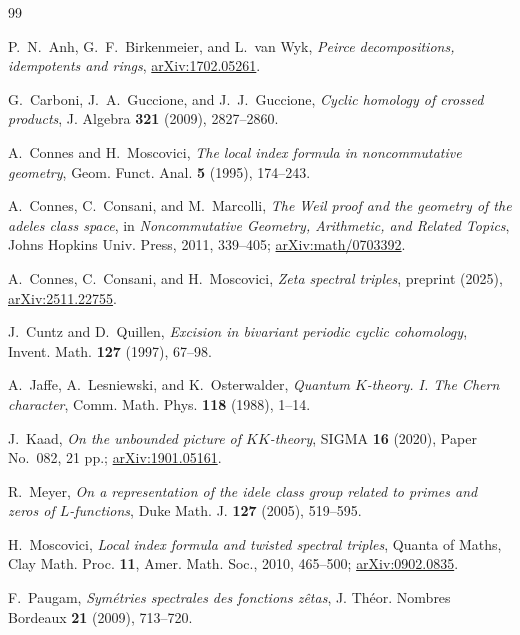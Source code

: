 \documentclass[11pt,reqno]{amsart}
\begin{document}
\begin{thebibliography}{99}

P.~N.~Anh, G.~F.~Birkenmeier, and L.~van Wyk,
\emph{Peirce decompositions, idempotents and rings},
\href{https://arxiv.org/abs/1702.05261}{arXiv:1702.05261}.

G.~Carboni, J.~A.~Guccione, and J.~J.~Guccione,
\emph{Cyclic homology of crossed products},
J. Algebra \textbf{321} (2009), 2827--2860.

A.~Connes and H.~Moscovici,
\emph{The local index formula in noncommutative geometry},
Geom. Funct. Anal. \textbf{5} (1995), 174--243.

A.~Connes, C.~Consani, and M.~Marcolli,
\emph{The Weil proof and the geometry of the adeles class space},
in \emph{Noncommutative Geometry, Arithmetic, and Related Topics},
Johns Hopkins Univ. Press, 2011, 339--405;
\href{https://arxiv.org/abs/math/0703392}{arXiv:math/0703392}.

A.~Connes, C.~Consani, and H.~Moscovici,
\emph{Zeta spectral triples},
preprint (2025),
\href{https://arxiv.org/abs/2511.22755}{arXiv:2511.22755}.

J.~Cuntz and D.~Quillen,
\emph{Excision in bivariant periodic cyclic cohomology},
Invent. Math. \textbf{127} (1997), 67--98.

A.~Jaffe, A.~Lesniewski, and K.~Osterwalder,
\emph{Quantum $K$-theory. I. The Chern character},
Comm. Math. Phys. \textbf{118} (1988), 1--14.

J.~Kaad,
\emph{On the unbounded picture of $KK$-theory},
SIGMA \textbf{16} (2020), Paper No.~082, 21 pp.;
\href{https://arxiv.org/abs/1901.05161}{arXiv:1901.05161}.

R.~Meyer,
\emph{On a representation of the idele class group related to primes and zeros of
$L$-functions},
Duke Math. J. \textbf{127} (2005), 519--595.

H.~Moscovici,
\emph{Local index formula and twisted spectral triples},
Quanta of Maths, Clay Math. Proc. \textbf{11}, Amer. Math. Soc., 2010, 465--500;
\href{https://arxiv.org/abs/0902.0835}{arXiv:0902.0835}.

F.~Paugam,
\emph{Sym\'etries spectrales des fonctions z\^etas},
J. Th\'eor. Nombres Bordeaux \textbf{21} (2009), 713--720.

\end{thebibliography}
\end{document}
